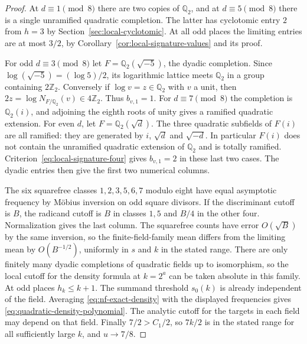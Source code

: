 \documentclass[11pt,letterpaper]{article}
\theoremstyle{definition}
\numberwithin{equation}{section}
\begin{document}
\begin{proof}
At $d\equiv1\pmod8$ there are two copies of $\mathbb Q_2$, and
at $d\equiv5\pmod8$ there is a single unramified quadratic completion.
The latter has cyclotomic entry $2$ from $h=3$ by
Section~\ref{sec:local-cyclotomic}. At all odd places the limiting
entries are at most $3/2$, by Corollary~\ref{cor:local-signature-values}
and its proof.

For odd $d\equiv3\pmod8$ let $F=\mathbb Q_2(\sqrt{-5})$, the
dyadic completion. Since $\log(\sqrt{-5})=(\log 5)/2$,
its logarithmic lattice meets $\mathbb Q_2$ in a group containing
$2\mathbb Z_2$. Conversely if $\log v=z\in\mathbb Q_2$ with $v$ a
unit, then $2z=\log N_{F/\mathbb Q_2}(v)\in4\mathbb Z_2$.
Thus $b_{v,1}=1$. For $d\equiv7\pmod8$ the completion is
$\mathbb Q_2(i)$, and adjoining the eighth roots of unity gives a
ramified quadratic extension. For even $d$, let $F=\mathbb Q_2(\sqrt d)$.
The three quadratic subfields of $F(i)$ are all ramified: they are
generated by $i$, $\sqrt d$ and $\sqrt{-d}$. In particular $F(i)$
does not contain the unramified quadratic extension of $\mathbb Q_2$
and is totally ramified. Criterion~\eqref{eq:local-signature-four}
gives $b_{v,1}=2$ in these last two cases. The dyadic entries then
give the first two numerical columns.

The six squarefree classes $1,2,3,5,6,7$ modulo eight have equal
asymptotic frequency by M\"obius inversion on odd square divisors.
If the discriminant cutoff is $B$, the radicand cutoff is $B$ in
classes $1,5$ and $B/4$ in the other four. Normalization gives
the last column. The squarefree counts have error $O(\sqrt B)$ by the same inversion, so the finite-field-family mean differs from the limiting mean by $O(B^{-1/2})$, uniformly in $s$ and $k$ in the stated range. There are only finitely many dyadic completions
of quadratic fields up to isomorphism, so the local cutoff for the
density formula at $k=2^a$ can be taken absolute in this family.
At odd places $h_k\le k+1$. The summand threshold $s_0(k)$ is
already independent of the field. Averaging
\eqref{eq:nf-exact-density} with the displayed frequencies gives
\eqref{eq:quadratic-density-polynomial}. The analytic cutoff for
the targets in each field may depend on that field. Finally
$7/2>C_1/2$, so $7k/2$ is in the stated range for all sufficiently
large $k$, and $u\to7/8$.
\end{proof}
\end{document}
